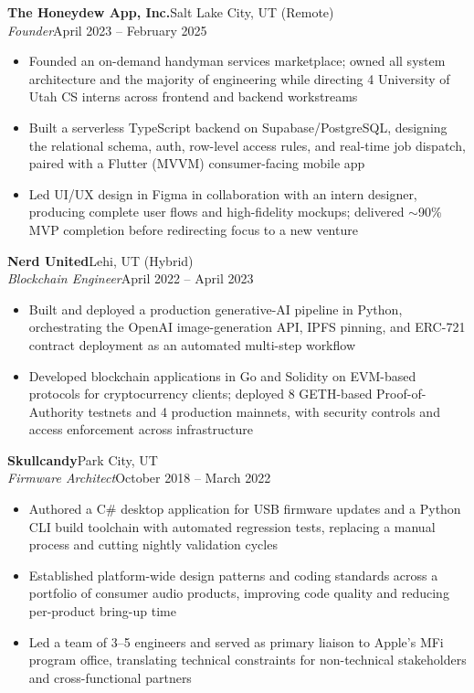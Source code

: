 \documentclass[10.5pt, letterpaper]{article}
\newcommand{\jobentry}[4]{%
  \noindent
  \textbf{\color{accent}#1}\hfill\textcolor{muted}{\small #2}\\
  \textit{#3}\hfill\textcolor{muted}{\small #4}%
}
\begin{document}
\vspace{5pt}

\jobentry{The Honeydew App, Inc.}{Salt Lake City, UT (Remote)}{Founder}{April 2023 -- February 2025}
\begin{itemize}
  \item Founded an on-demand handyman services marketplace; owned all system
        architecture and the majority of engineering while directing 4 University
        of Utah CS interns across frontend and backend workstreams
  \item Built a serverless TypeScript backend on Supabase/PostgreSQL, designing the
        relational schema, auth, row-level access rules, and real-time job dispatch,
        paired with a Flutter (MVVM) consumer-facing mobile app
  \item Led UI/UX design in Figma in collaboration with an intern designer,
        producing complete user flows and high-fidelity mockups; delivered
        $\sim$90\% MVP completion before redirecting focus to a new venture
\end{itemize}

\vspace{5pt}

\jobentry{Nerd United}{Lehi, UT (Hybrid)}{Blockchain Engineer}{April 2022 -- April 2023}
\begin{itemize}
  \item Built and deployed a production generative-AI pipeline in Python, orchestrating
        the OpenAI image-generation API, IPFS pinning, and ERC-721 contract deployment
        as an automated multi-step workflow
  \item Developed blockchain applications in Go and Solidity on EVM-based protocols for
        cryptocurrency clients; deployed 8 GETH-based Proof-of-Authority testnets and 4
        production mainnets, with security controls and access enforcement across
        infrastructure
\end{itemize}

\vspace{5pt}

\jobentry{Skullcandy}{Park City, UT}{Firmware Architect}{October 2018 -- March 2022}
\begin{itemize}
  \item Authored a C\# desktop application for USB firmware updates and a Python
        CLI build toolchain with automated regression tests, replacing a manual
        process and cutting nightly validation cycles
  \item Established platform-wide design patterns and coding standards across a
        portfolio of consumer audio products, improving code quality and reducing
        per-product bring-up time
  \item Led a team of 3--5 engineers and served as primary liaison to Apple's MFi
        program office, translating technical constraints for non-technical
        stakeholders and cross-functional partners
\end{itemize}
\end{document}
